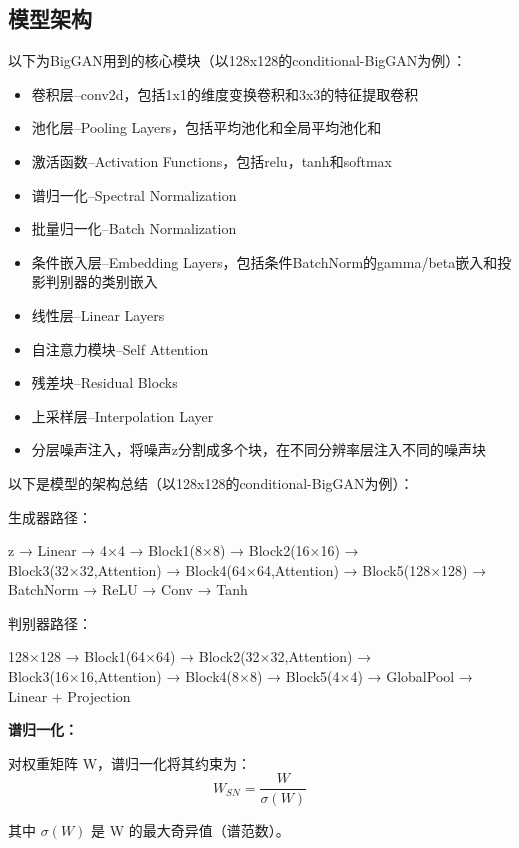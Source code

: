 \documentclass[12pt, a4paper]{article}
\begin{document}
\newpage
\subsection{模型架构}

以下为BigGAN用到的核心模块（以128x128的conditional-BigGAN为例）：
\begin{itemize}
    \item 卷积层--conv2d，包括1x1的维度变换卷积和3x3的特征提取卷积
    \item 池化层--Pooling Layers，包括平均池化和全局平均池化和
    \item 激活函数--Activation Functions，包括relu，tanh和softmax
    \item 谱归一化--Spectral Normalization
    \item 批量归一化--Batch Normalization
    \item 条件嵌入层--Embedding Layers，包括条件BatchNorm的gamma/beta嵌入和投影判别器的类别嵌入
    \item 线性层--Linear Layers
    \item 自注意力模块--Self Attention
    \item 残差块--Residual Blocks
    \item 上采样层--Interpolation Layer 
    \item 分层噪声注入，将噪声z分割成多个块，在不同分辨率层注入不同的噪声块
\end{itemize}

以下是模型的架构总结（以128x128的conditional-BigGAN为例）：
\vspace{1cm}


生成器路径：

z → Linear → 4×4 → Block1(8×8) → Block2(16×16) 
           → Block3(32×32,Attention) → Block4(64×64,Attention) 
           → Block5(128×128) → BatchNorm → ReLU → Conv → Tanh


\vspace{1cm}
判别器路径：

128×128 → Block1(64×64) → Block2(32×32,Attention) 
           → Block3(16×16,Attention) → Block4(8×8) → Block5(4×4) 
           → GlobalPool → Linear + Projection

\newpage

\begin{center}
\textbf{谱归一化：}
\end{center}

对权重矩阵 W，谱归一化将其约束为：
$$W_{SN} = \frac{W}{\sigma(W)}$$

其中 $\sigma(W)$ 是 W 的最大奇异值（谱范数）。
\end{document}
